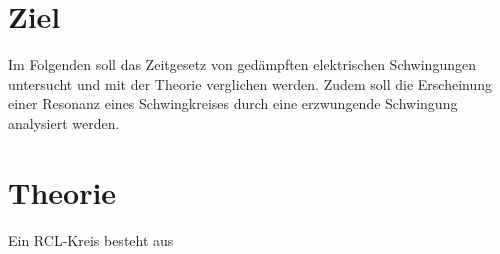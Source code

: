 \newpage

\section*{Ziel}
Im Folgenden soll das Zeitgesetz von gedämpften elektrischen Schwingungen untersucht und mit
der Theorie verglichen werden.
Zudem soll die Erscheinung einer Resonanz eines Schwingkreises 
durch eine erzwungende Schwingung analysiert werden.

\section{Theorie}
Ein RCL-Kreis besteht aus

\label{sec:theorie}